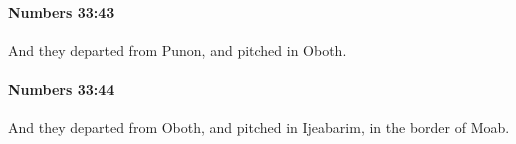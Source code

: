 		\paragraph{Numbers 33:43} %
			\label{NUMBERS-33-43}

			And they departed from Punon, and pitched in Oboth.


		\paragraph{Numbers 33:44} %
			\label{NUMBERS-33-44}

			And they departed from Oboth, and pitched in Ijeabarim, in the border of Moab.


